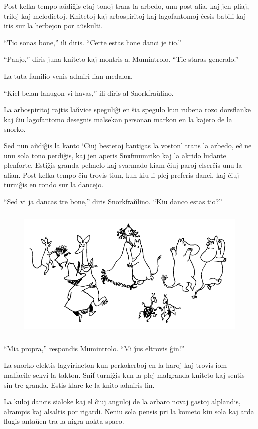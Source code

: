 Post kelka tempo aŭdiĝis etaj tonoj trans la arbedo, unu post alia, kaj jen pliaj, triloj kaj melodietoj. Knitetoj kaj arbospiritoj kaj lagofantomoj ĉesis babili kaj iris sur la herbejon por aŭskulti.

``Tio sonas bone,'' ili diris. ``Certe estas bone danci je tio.''

``Panjo,'' diris juna kniteto kaj montris al Mumintrolo. ``Tie staras generalo.''

La tuta familio venis admiri lian medalon.

``Kiel belan lanugon vi havas,'' ili diris al Snorkfraŭlino.

La arbospiritoj rajtis laŭvice speguliĝi en ŝia spegulo kun rubena rozo dorsflanke kaj ĉiu lagofantomo desegnis malsekan personan markon en la kajero de la snorko.

Sed nun aŭdiĝis la kanto `Ĉiuj bestetoj bantigas la voston' trans la arbedo, eĉ ne unu sola tono perdiĝis, kaj jen aperis Snufmumriko kaj la akrido ludante plenforte. Estiĝis granda pelmelo kaj svarmado kiam ĉiuj paroj elserĉis unu la alian. Post kelka tempo ĉiu trovis tiun, kun kiu li plej preferis danci, kaj ĉiuj turniĝis en rondo sur la dancejo.

``Sed vi ja dancas tre bone,'' diris Snorkfraŭlino. ``Kiu danco estas tio?''

\begin{figure}[htbp]
\centering
\includegraphics[width=350pt,height=182pt]{6-7.png}
\caption{}
\label{6-7}
\end{figure}

``Mia propra,'' respondis Mumintrolo. ``Mi ĵus eltrovis ĝin!''

La snorko elektis lagvirineton kun perkoherboj en la haroj kaj trovis iom malfacile sekvi la takton. Snif turniĝis kun la plej malgranda kniteto kaj sentis sin tre granda. Estis klare ke la knito admiris lin.

La kuloj dancis sialoke kaj el ĉiuj anguloj de la arbaro novaj gastoj alplandis, alrampis kaj alsaltis por rigardi. Neniu sola pensis pri la kometo kiu sola kaj arda flugis antaŭen tra la nigra nokta spaco.

